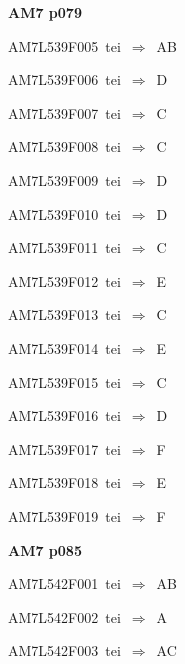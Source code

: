 \par\vfill\eject
{\bf\hfill AM7 p079\hfill\hbox{}}\par\bigskip
{\sixrm AM7L539F005\ {\sixit tei}\ }$\Rightarrow$\ AB\par\smallskip
{\sixrm AM7L539F006\ {\sixit tei}\ }$\Rightarrow$\ D\par\smallskip
{\sixrm AM7L539F007\ {\sixit tei}\ }$\Rightarrow$\ C\par\smallskip
{\sixrm AM7L539F008\ {\sixit tei}\ }$\Rightarrow$\ C\par\smallskip
{\sixrm AM7L539F009\ {\sixit tei}\ }$\Rightarrow$\ D\par\smallskip
{\sixrm AM7L539F010\ {\sixit tei}\ }$\Rightarrow$\ D\par\smallskip
{\sixrm AM7L539F011\ {\sixit tei}\ }$\Rightarrow$\ C\par\smallskip
{\sixrm AM7L539F012\ {\sixit tei}\ }$\Rightarrow$\ E\par\smallskip
{\sixrm AM7L539F013\ {\sixit tei}\ }$\Rightarrow$\ C\par\smallskip
{\sixrm AM7L539F014\ {\sixit tei}\ }$\Rightarrow$\ E\par\smallskip
{\sixrm AM7L539F015\ {\sixit tei}\ }$\Rightarrow$\ C\par\smallskip
{\sixrm AM7L539F016\ {\sixit tei}\ }$\Rightarrow$\ D\par\smallskip
{\sixrm AM7L539F017\ {\sixit tei}\ }$\Rightarrow$\ F\par\smallskip
{\sixrm AM7L539F018\ {\sixit tei}\ }$\Rightarrow$\ E\par\smallskip
{\sixrm AM7L539F019\ {\sixit tei}\ }$\Rightarrow$\ F\par\smallskip

\par\vfill\eject
{\bf\hfill AM7 p085\hfill\hbox{}}\par\bigskip
{\sixrm AM7L542F001\ {\sixit tei}\ }$\Rightarrow$\ AB\par\smallskip
{\sixrm AM7L542F002\ {\sixit tei}\ }$\Rightarrow$\ A\par\smallskip
{\sixrm AM7L542F003\ {\sixit tei}\ }$\Rightarrow$\ AC\par\smallskip

